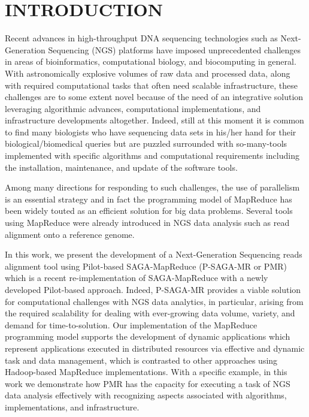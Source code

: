 \documentclass{sig-alternate}
\begin{document}

\section{INTRODUCTION} 
Recent advances in high-throughput DNA sequencing technologies such as Next-Generation Sequencing (NGS) platforms have  imposed unprecedented challenges in areas of bioinformatics, computational biology, and biocomputing in general\cite{metzker2010,1000genome,wang2009-natrevgen,alex2009,mcpherson2009}.  With astronomically explosive volumes of raw data and processed data, along with required computational tasks that often need scalable infrastructure, these challenges are to some extent novel because of the need of an integrative solution leveraging algorithmic advances, computational implementations, and infrastructure developments altogether. Indeed, still at this moment it is common to find many biologists who have sequencing data sets in his/her hand for their biological/biomedical queries but are puzzled surrounded with so-many-tools implemented with specific algorithms and computational requirements including the installation, maintenance, and update of the software tools. 

Among many directions for responding to such challenges, the use of parallelism is an essential strategy and in fact the programming model of MapReduce has been widely touted as an efficient solution for big data problems\cite{mapreduce-2004-dean}.  Several tools using MapReduce were already introduced in NGS data analysis such as read alignment onto a reference genome\cite{cloudburst, gatk,langmead2009,seal2011,langmead2010, taylor2010}.

In this work, we present the development of a Next-Generation Sequencing reads alignment tool using Pilot-based SAGA-MapReduce (P-SAGA-MR or PMR) which is a recent re-implementation of SAGA-MapReduce with a newly developed Pilot-based approach\cite{Sehgal2011590,pmr2012}.  Indeed, P-SAGA-MR provides a viable solution for computational challenges with NGS data analytics, in particular, arising from the required scalability for dealing with ever-growing data volume, variety, and demand for time-to-solution.  Our implementation of the MapReduce programming model supports the development of dynamic applications which represent applications executed in distributed resources via effective and dynamic task and data management, which is contrasted to other approaches using Hadoop-based MapReduce implementations\cite{cloudburst,langmead2009,seal2011,langmead2010}.  With a specific example, in this work we demonstrate how PMR has the capacity for executing a task of NGS data analysis effectively with recognizing aspects associated with algorithms, implementations, and infrastructure.
\end{document}

